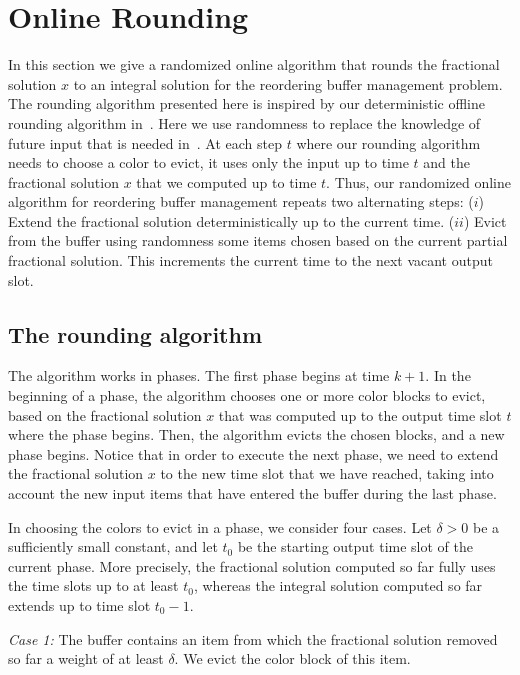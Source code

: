 \documentclass[12pt]{article}
\begin{document}
\section{Online Rounding}\label{sec: online rounding}

In this section we give a randomized online algorithm that
rounds the fractional solution $x$ to an integral solution
for the reordering buffer management problem.
The rounding algorithm presented here is inspired
by our deterministic offline rounding algorithm in~\cite{AR13}.
Here we use randomness to replace the knowledge of future
input that is needed in~\cite{AR13}. 
At each
step $t$ where our rounding algorithm needs to choose a
color to evict, it uses only the input up to time $t$ and the 
fractional solution $x$ that we computed up to time $t$. 
Thus, our randomized online algorithm for reordering buffer 
management repeats two alternating steps: ($i$) Extend the 
fractional solution deterministically up to the current time. 
($ii$) Evict from the buffer using randomness some items 
chosen based on the current partial fractional solution. This 
increments the current time to the next vacant output slot.



\subsection{The rounding algorithm}

The algorithm works in phases. The first phase begins at
time $k+1$. In the beginning of a phase, the algorithm
chooses one or more color blocks to evict, based on the 
fractional
solution $x$ that was computed up to the output time
slot $t$ where the phase begins. Then, the algorithm 
evicts the chosen
blocks, and a new phase begins. Notice that
in order to execute the next phase, we need to extend
the fractional solution $x$ to the new time slot that we 
have reached, taking into account the new input items 
that have entered the buffer during the last phase.

In choosing the colors to evict in a phase, we consider
four cases. Let $\delta > 0$ be a sufficiently small constant, 
and let $t_0$ be the starting output time slot of the current 
phase. More precisely, the fractional solution computed so
far fully uses the time slots up to at least $t_0$, whereas the 
integral solution computed so far extends up to time slot 
$t_0 - 1$.

{\em Case 1:}\/ The buffer contains an item from which 
the fractional solution removed so far a weight of at least 
$\delta$. We evict the color block of this item.
\end{document}

